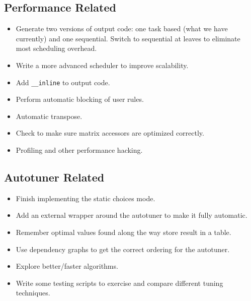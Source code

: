 \documentclass[11pt]{article}
\begin{document}
\subsection{Performance Related}
\begin{itemize}

\item Generate two versions of output code:  one task based (what we have
    currently) and one sequential. Switch to sequential at leaves to
    eliminate most scheduling overhead.
  
\item Write a more advanced scheduler to improve scalability.

\item Add {\tt \_\_inline} to output code.

\item Perform automatic blocking of user rules.

\item Automatic transpose.

\item Check to make sure matrix accessors are optimized correctly.

\item Profiling and other performance hacking.

\end{itemize}

\subsection{Autotuner Related}
\begin{itemize}

\item Finish implementing the static choices mode.

\item Add an external wrapper around the autotuner to make it fully automatic.

\item Remember optimal values found along the way store result in a table.

\item Use dependency graphs to get the correct ordering for the autotuner.

\item Explore better/faster algorithms.

\item Write some testing scripts to exercise and compare different tuning techniques.

\end{itemize}
\end{document}
